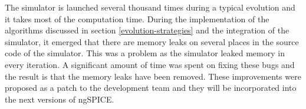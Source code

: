 The simulator is launched several thousand times during a typical evolution and it takes most of the computation time. During the implementation of the algorithms discussed in section \ref{evolution-strategies} and the integration of the simulator, it emerged that there are memory leaks on several places in the source code of the simulator. This was a problem as the simulator leaked memory in every iteration. A significant amount of time was spent on fixing these bugs and the result is that the memory leaks have been removed. These improvements were proposed as a patch to the development team and they will be incorporated into the next versions of ngSPICE.